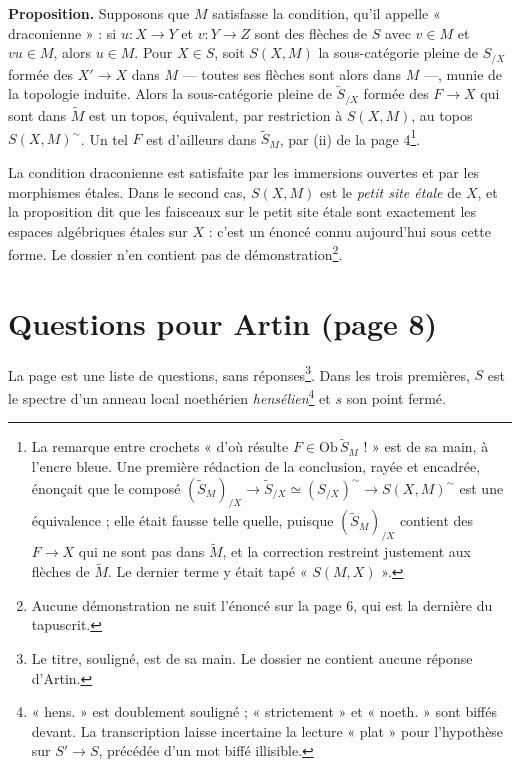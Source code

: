 \documentclass[11pt,a4paper]{article}
\begin{document}
\textbf{Proposition.} Supposons que $M$ satisfasse la condition, qu'il appelle
« draconienne » : si $u : X \to Y$ et $v : Y \to Z$ sont des flèches de $S$ avec
$v \in M$ et $vu \in M$, alors $u \in M$. Pour $X \in S$, soit $S(X,M)$ la
sous-catégorie pleine de $S_{/X}$ formée des $X' \to X$ dans $M$ — toutes ses
flèches sont alors dans $M$ —, munie de la topologie induite. Alors la
sous-catégorie pleine de $\widetilde{S}_{/X}$ formée des $F \to X$ qui sont dans
$\widetilde{M}$ est un topos, équivalent, par restriction à $S(X,M)$, au topos
$S(X,M)^{\sim}$. Un tel $F$ est d'ailleurs dans $\widetilde{S}_M$, par (ii) de
la page 4\footnote{La remarque entre crochets « d'où résulte
$F \in \mathrm{Ob}\,\widetilde{S}_M$ ! » est de sa main, à l'encre bleue. Une
première rédaction de la conclusion, rayée et encadrée, énonçait que le composé
$(\widetilde{S}_M)_{/X} \to \widetilde{S}_{/X} \simeq (S_{/X})^{\sim} \to
S(X,M)^{\sim}$ est une équivalence ; elle était fausse telle quelle, puisque
$(\widetilde{S}_M)_{/X}$ contient des $F \to X$ qui ne sont pas dans
$\widetilde{M}$, et la correction restreint justement aux flèches de
$\widetilde{M}$. Le dernier terme y était tapé « $S(M,X)$ ».}.

La condition draconienne est satisfaite par les immersions ouvertes et par les
morphismes étales. Dans le second cas, $S(X,M)$ est le \emph{petit site étale}
de $X$, et la proposition dit que les faisceaux sur le petit site étale sont
exactement les espaces algébriques étales sur $X$ : c'est un énoncé connu
aujourd'hui sous cette forme. Le dossier n'en contient pas de
démonstration\footnote{Aucune démonstration ne suit l'énoncé sur la page 6, qui
est la dernière du tapuscrit.}.

\section*{Questions pour Artin (page 8)}

La page est une liste de questions, sans réponses\footnote{Le titre, souligné,
est de sa main. Le dossier ne contient aucune réponse d'Artin.}. Dans les trois
premières, $S$ est le spectre d'un anneau local noethérien
\emph{hensélien}\footnote{« hens. » est doublement souligné ; « strictement »
et « noeth. » sont biffés devant. La transcription laisse incertaine la lecture
« plat » pour l'hypothèse sur $S' \to S$, précédée d'un mot biffé illisible.} et
$s$ son point fermé.
\end{document}
